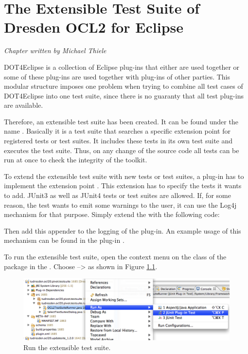 \chapter{The Extensible Test Suite of Dresden OCL2 for Eclipse}
\label{chapter:generalTestSuite}

\begin{flushright}
\textit{Chapter written by Michael Thiele}
\end{flushright}

\acl{DOT4Eclipse} is a collection of Eclipse plug-ins that either are used together or some of these plug-ins are used together with plug-ins of other parties. This modular structure imposes one problem when trying to combine all test cases of \acl{DOT4Eclipse} into one test suite, since there is no guaranty that all test plug-ins are available.

Therefore, an extensible test suite has been created. It can be found under the name . Basically it is a test suite that searches a specific extension point for registered tests or test suites. It includes these tests in its own test suite and executes the test suite. Thus, on any change of the source code all tests can be run at once to check the integrity of the toolkit.

To extend the extensible test suite with new tests or test suites, a plug-in has to implement the extension point . This extension has to specify the tests it wants to add. JUnit3 as well as JUnit4 tests or test suites are allowed. If, for some reason, the test wants to emit some warnings to the user, it can use the Log4j mechanism for that purpose. Simply extend the  with the following code:


Then add this appender to the logging of the plug-in. An example usage of this mechanism can be found in the plug-in .

To run the extensible test suite, open the context menu on the class  of the package  in the . Choose  --\textgreater {} as shown in Figure \ref{pic:generalTestSuite:RunAs}.

\begin{figure}[!htbp]
	\centering
	\includegraphics[width=1.0\linewidth]{figures/generalTestSuite/RunAs}
	\caption{Run the extensible test suite.}
	\label{pic:generalTestSuite:RunAs}
\end{figure}